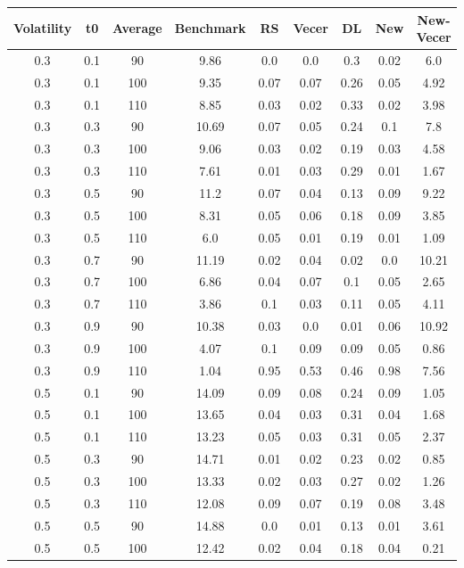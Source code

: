 \documentclass[12pt]{report}
\begin{document}
\begin{table}[H]
  \begin{tabular}{|c|c|c|c|c|c|c|c|c|}
  \hline
  Volatility & t0 & Average & Benchmark & RS & Vecer & DL & New & New-Vecer \\
  \hline
  0.3 & 0.1 & 90 & 9.86 & 0.0 & 0.0 & 0.3 & 0.02 & 6.0 \\
  0.3 & 0.1 & 100 & 9.35 & 0.07 & 0.07 & 0.26 & 0.05 & 4.92 \\
  0.3 & 0.1 & 110 & 8.85 & 0.03 & 0.02 & 0.33 & 0.02 & 3.98 \\
  0.3 & 0.3 & 90 & 10.69 & 0.07 & 0.05 & 0.24 & 0.1 & 7.8 \\
  0.3 & 0.3 & 100 & 9.06 & 0.03 & 0.02 & 0.19 & 0.03 & 4.58 \\
  0.3 & 0.3 & 110 & 7.61 & 0.01 & 0.03 & 0.29 & 0.01 & 1.67 \\
  0.3 & 0.5 & 90 & 11.2 & 0.07 & 0.04 & 0.13 & 0.09 & 9.22 \\
  0.3 & 0.5 & 100 & 8.31 & 0.05 & 0.06 & 0.18 & 0.09 & 3.85 \\
  0.3 & 0.5 & 110 & 6.0 & 0.05 & 0.01 & 0.19 & 0.01 & 1.09 \\
  0.3 & 0.7 & 90 & 11.19 & 0.02 & 0.04 & 0.02 & 0.0 & 10.21 \\
  0.3 & 0.7 & 100 & 6.86 & 0.04 & 0.07 & 0.1 & 0.05 & 2.65 \\
  0.3 & 0.7 & 110 & 3.86 & 0.1 & 0.03 & 0.11 & 0.05 & 4.11 \\
  0.3 & 0.9 & 90 & 10.38 & 0.03 & 0.0 & 0.01 & 0.06 & 10.92 \\
  0.3 & 0.9 & 100 & 4.07 & 0.1 & 0.09 & 0.09 & 0.05 & 0.86 \\
  0.3 & 0.9 & 110 & 1.04 & 0.95 & 0.53 & 0.46 & 0.98 & 7.56 \\
  0.5 & 0.1 & 90 & 14.09 & 0.09 & 0.08 & 0.24 & 0.09 & 1.05 \\
  0.5 & 0.1 & 100 & 13.65 & 0.04 & 0.03 & 0.31 & 0.04 & 1.68 \\
  0.5 & 0.1 & 110 & 13.23 & 0.05 & 0.03 & 0.31 & 0.05 & 2.37 \\
  0.5 & 0.3 & 90 & 14.71 & 0.01 & 0.02 & 0.23 & 0.02 & 0.85 \\
  0.5 & 0.3 & 100 & 13.33 & 0.02 & 0.03 & 0.27 & 0.02 & 1.26 \\
  0.5 & 0.3 & 110 & 12.08 & 0.09 & 0.07 & 0.19 & 0.08 & 3.48 \\
  0.5 & 0.5 & 90 & 14.88 & 0.0 & 0.01 & 0.13 & 0.01 & 3.61 \\
  0.5 & 0.5 & 100 & 12.42 & 0.02 & 0.04 & 0.18 & 0.04 & 0.21 \\

\end{tabular}
\end{table}
\end{document}
